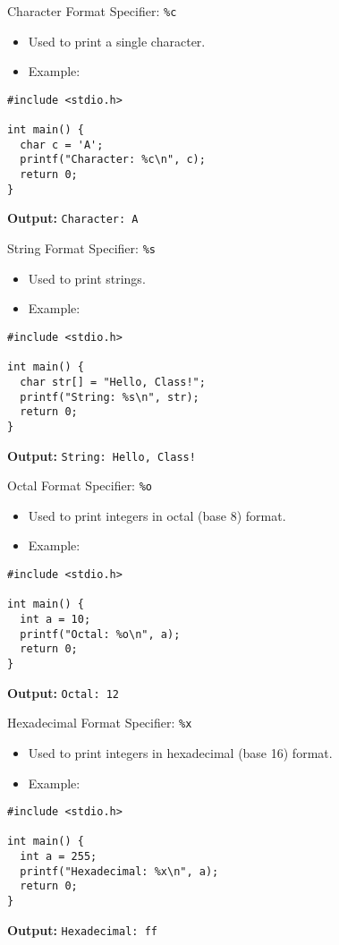 \documentclass{beamer}
\begin{document}
\begin{frame}[fragile]{Character Format Specifier: \texttt{\%c}}
  \begin{itemize}
    \item Used to print a single character.
    \item Example:
  \end{itemize}
  \begin{lstlisting}
#include <stdio.h>

int main() {
  char c = 'A';
  printf("Character: %c\n", c);
  return 0;
}
  \end{lstlisting}
  \textbf{Output:} \texttt{Character: A}
\end{frame}

\begin{frame}[fragile]{String Format Specifier: \texttt{\%s}}
  \begin{itemize}
    \item Used to print strings.
    \item Example:
  \end{itemize}
  \begin{lstlisting}
#include <stdio.h>

int main() {
  char str[] = "Hello, Class!";
  printf("String: %s\n", str);
  return 0;
}
  \end{lstlisting}
  \textbf{Output:} \texttt{String: Hello, Class!}
\end{frame}

\begin{frame}[fragile]{Octal Format Specifier: \texttt{\%o}}
  \begin{itemize}
    \item Used to print integers in octal (base 8) format.
    \item Example:
  \end{itemize}
  \begin{lstlisting}
#include <stdio.h>

int main() {
  int a = 10;
  printf("Octal: %o\n", a);
  return 0;
}
  \end{lstlisting}
  \textbf{Output:} \texttt{Octal: 12}
\end{frame}

\begin{frame}[fragile]{Hexadecimal Format Specifier: \texttt{\%x}}
  \begin{itemize}
    \item Used to print integers in hexadecimal (base 16) format.
    \item Example:
  \end{itemize}
  \begin{lstlisting}
#include <stdio.h>

int main() {
  int a = 255;
  printf("Hexadecimal: %x\n", a);
  return 0;
}
  \end{lstlisting}
  \textbf{Output:} \texttt{Hexadecimal: ff}
\end{frame}
\end{document}
